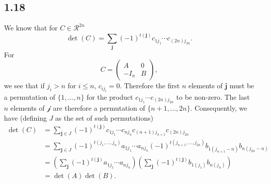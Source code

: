 \subsection*{1.18}
\begin{solution}
  We know that for $C \in \mathcal{R}^{2n}$
  \[ \det(C) = \sum_{\mathbf{j}} (-1)^{t(\mathbf{j})} c_{1j_1} \cdots c_{(2n)j_{2n}}. \]
  For
  \[
    C = \begin{pmatrix}
      A & 0\\
      -I_n & B
    \end{pmatrix},
  \]
  we see that if $j_i > n$ for $i \leq n$, $c_{ij_i} = 0$.
  Therefore the first $n$ elements of $\mathbf{j}$ must be a permutation of $\{1, \ldots, n\}$
  for the product $c_{1j_1} \cdots c_{(2n)j_{2n}}$ to be non-zero.
  The last $n$ elements of $\mathcal{j}$ are therefore a permutation of $\{n+1, \ldots, 2n\}$.
  Consequently, we have (defining $J$ as the set of such permutations)
  \begin{align*}
    \det(C)
    & = \sum_{\mathbf{j} \in J} (-1)^{t(\mathbf{j})} c_{1j_1} \cdots c_{nj_n} c_{(n+1)j_{n+1}} c_{(2n)j_{2n}}\\
    & = \sum_{\mathbf{j} \in J} (-1)^{t(j_1, \ldots, j_n)} a_{1j_1} \cdots a_{nj_n} (-1)^{t(j_{n+1}, \ldots, j_{2n})} b_{1(j_{n+1}-n)} b_{n(j_{2n}-n)}\\
    & = \left(\sum_{\mathbf{j}} (-1)^{t(\mathbf{j})} a_{1j_1} \cdots a_{nj_n}\right)
    \left(\sum_{\mathbf{j}} (-1)^{t(\mathbf{j})} b_{1(j_1)} b_{n(j_n)}\right)\\
    & = \det(A) \det(B).
  \end{align*}


\end{solution}
